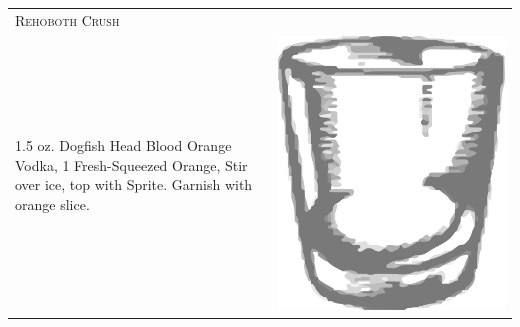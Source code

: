 \documentclass{article}
\begin{document}
\begin{tabular}{p{2in} p{0.5in}}
\multicolumn{2}{p{3in}}{\centering\Huge\textsc{Rehoboth Crush}} \\ 
  \vspace{-0.1in}1.5 oz. Dogfish Head Blood Orange Vodka, 1 Fresh-Squeezed Orange, Stir over ice, top with Sprite. Garnish with orange slice. &
  \vspace{-0.1in} \includegraphics{rocks_glass.png}
\end{tabular}
\end{document}
